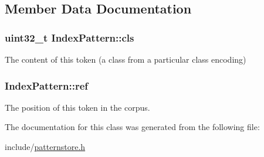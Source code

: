 \subsection{Member Data Documentation}
\hypertarget{classIndexPattern_afedfcca7851b65e8abca346df1d57e84}{}
\subsubsection[{cls}]{\setlength{\rightskip}{0pt plus 5cm}uint32\+\_\+t Index\+Pattern\+::cls}\label{classIndexPattern_afedfcca7851b65e8abca346df1d57e84}


The content of this token (a class from a particular class encoding) 

\hypertarget{classIndexPattern_a068a44839584d00943b1fe06a5166dc9}{}
\subsubsection[{ref}]{ Index\+Pattern\+::ref}\label{classIndexPattern_a068a44839584d00943b1fe06a5166dc9}


The position of this token in the corpus. 



The documentation for this class was generated from the following file\+:\begin{DoxyCompactItemize}
\item 
include/\hyperlink{patternstore_8h}{patternstore.\+h}\end{DoxyCompactItemize}
